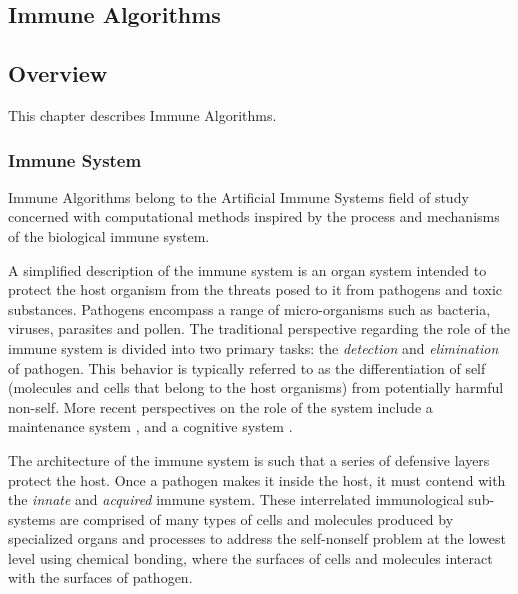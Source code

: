 

\renewcommand{\bibsection}{\subsection{\bibname}}
\begin{bibunit}

\chapter{Immune Algorithms}
\label{ch:immune}

\section{Overview}
This chapter describes Immune Algorithms.

\subsection{Immune System}
Immune Algorithms belong to the Artificial Immune Systems field of study concerned with computational methods inspired by the process and mechanisms of the biological immune system. 

A simplified description of the immune system is an organ system intended to protect the host organism from the threats posed to it from pathogens and toxic substances. Pathogens encompass a range of micro-organisms such as bacteria, viruses, parasites and pollen. The traditional perspective regarding the role of the immune system is divided into two primary tasks: the \emph{detection} and \emph{elimination} of pathogen. This behavior is typically referred to as the differentiation of self (molecules and cells that belong to the host organisms) from potentially harmful non-self. More recent perspectives on the role of the system include a maintenance system \cite{Cohen2001a}, and a cognitive system \cite{Varela1994}.

The architecture of the immune system is such that a series of defensive layers protect the host. Once a pathogen makes it inside the host, it must contend with the \emph{innate} and \emph{acquired} immune system. These interrelated immunological sub-systems are comprised of many types of cells  and molecules produced by specialized organs and processes to address the self-nonself problem at the lowest level using chemical bonding, where the surfaces of cells and molecules interact with the surfaces of pathogen.


\end{bibunit}
